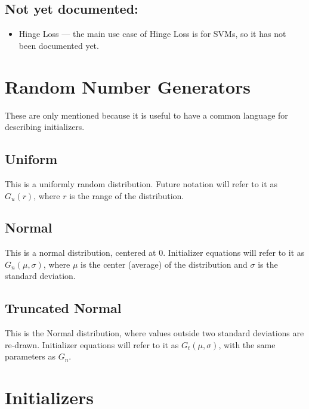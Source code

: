 \documentclass[fleqn]{article}
\begin{document}
\subsection{Not yet documented:}
\begin{itemize}
	\item Hinge Loss --- the main use case of Hinge Loss is for SVMs, so
		it has not been documented yet.
\end{itemize}


\section{Random Number Generators}
These are only mentioned because it is useful to have a common language
for describing initializers.

\subsection{Uniform}
This is a uniformly random distribution. Future notation will refer
to it as $G_u(r)$, where $r$ is the range of the distribution.

\subsection{Normal}
This is a normal distribution, centered at $0$. Initializer equations will
refer to it as $G_n(\mu, \sigma)$, where $\mu$ is the center (average) of
the distribution and $\sigma$ is the standard deviation.

\subsection{Truncated Normal}
This is the Normal distribution, where values outside two standard
deviations are re-drawn. Initializer equations will refer to it as
$G_t(\mu, \sigma)$, with the same parameters as $G_n$.


\section{Initializers}
\end{document}
